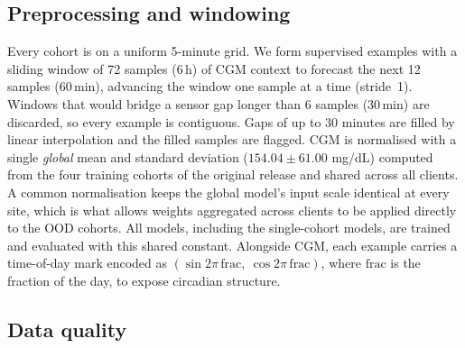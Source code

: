 \documentclass[10pt,letterpaper]{article}
\begin{document}
\subsection*{Preprocessing and windowing}

Every cohort is on a uniform 5-minute grid. We form supervised examples with a
sliding window of 72 samples (6\,h) of CGM context to forecast the next 12
samples (60\,min), advancing the window one sample at a time (stride~1).
Windows that would bridge a sensor gap longer than 6 samples (30\,min) are
discarded, so every example is contiguous. Gaps of up to 30 minutes are
filled by linear interpolation and the filled samples are flagged. CGM is
normalised with a single \emph{global} mean and standard deviation
($154.04 \pm 61.00$ mg/dL) computed from the four training cohorts of the
original release and shared across all clients. A common normalisation keeps
the global model's input scale identical at every site, which is what allows
weights aggregated across clients to be applied directly to the OOD cohorts.
All models, including the single-cohort models, are trained and evaluated
with this shared constant.
Alongside CGM, each example carries a time-of-day mark encoded as
$(\sin 2\pi\,\mathrm{frac},\ \cos 2\pi\,\mathrm{frac})$, where $\mathrm{frac}$
is the fraction of the day, to expose circadian structure.

\subsection*{Data quality}
\end{document}
